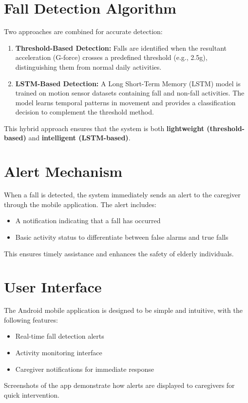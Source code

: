 \documentclass[a4paper, 12pt]{report}
\begin{document}
\section{Fall Detection Algorithm}
Two approaches are combined for accurate detection:
\begin{enumerate}[itemsep=-4pt, label=\roman*.]
    \item \textbf{Threshold-Based Detection:}  
    Falls are identified when the resultant acceleration (G-force) crosses a predefined threshold (e.g., 2.5g), distinguishing them from normal daily activities.
    
    \item \textbf{LSTM-Based Detection:}  
    A Long Short-Term Memory (LSTM) model is trained on motion sensor datasets containing fall and non-fall activities. The model learns temporal patterns in movement and provides a classification decision to complement the threshold method.
\end{enumerate}
This hybrid approach ensures that the system is both \textbf{lightweight (threshold-based)} and \textbf{intelligent (LSTM-based)}.

\section{Alert Mechanism}
When a fall is detected, the system immediately sends an alert to the caregiver through the mobile application. The alert includes:
\begin{itemize}[itemsep=-4pt]
    \item A notification indicating that a fall has occurred
    \item Basic activity status to differentiate between false alarms and true falls
\end{itemize}
This ensures timely assistance and enhances the safety of elderly individuals.

\section{User Interface}
The Android mobile application is designed to be simple and intuitive, with the following features:
\begin{itemize}[itemsep=-4pt]
    \item Real-time fall detection alerts
    \item Activity monitoring interface
    \item Caregiver notifications for immediate response
\end{itemize}
Screenshots of the app demonstrate how alerts are displayed to caregivers for quick intervention.
\end{document}
